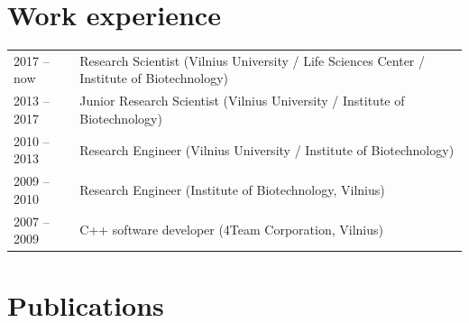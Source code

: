\documentclass{article}
\begin{document}
\section*{Work experience}
\begin{tabular}{p{}p{}}
2017 -- now  & Research Scientist (Vilnius University / Life Sciences Center / Institute of Biotechnology)\\
2013 -- 2017 & Junior Research Scientist (Vilnius University / Institute of Biotechnology) \\
2010 -- 2013 & Research Engineer (Vilnius University / Institute of Biotechnology) \\
2009 -- 2010 & Research Engineer (Institute of Biotechnology, Vilnius) \\
2007 -- 2009 & C++ software developer (4Team Corporation, Vilnius)
\end{tabular}

\section*{Publications}
\end{document}
